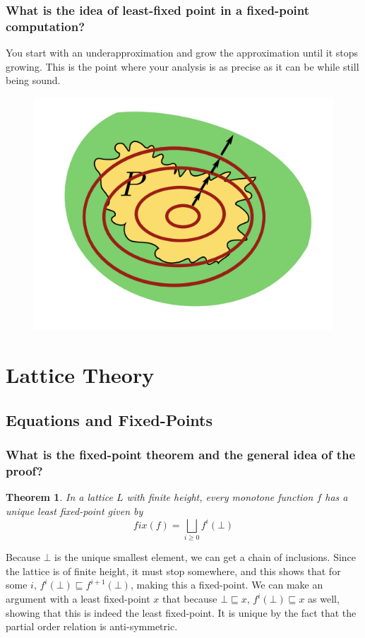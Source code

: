 \documentclass[12pt]{article}
\newenvironment{proof-idea}{\noindent{\bf Proof Idea}\hspace*{1em}}{\qed\bigskip}
\newtheorem*{theorem}{Theorem}
\theoremstyle{remark}
\theoremstyle{remark}
\begin{document}
\subsubsection{What is the idea of least-fixed point in a fixed-point computation?}
You start with an underapproximation and grow the approximation until it stops growing. This is the point where your analysis is as precise as it can be while still being sound.
\begin{figure}[h]
    \centering
    \includegraphics[scale=0.5]{least-fixed-point.png}
\end{figure}

\section{Lattice Theory}
\subsection{Equations and Fixed-Points}
\subsubsection{What is the fixed-point theorem and the general idea of the proof?}
\begin{theorem}
    In a lattice $L$ with finite height, every monotone function $f$ has a unique least fixed-point given by
    \[fix(f) = \bigsqcup_{i \geq 0} f^i (\bot)\]
\end{theorem}
\begin{proof-idea}
Because $\bot$ is the unique smallest element, we can get a chain of inclusions. Since the lattice is of finite height, it must stop somewhere, and this shows that for some $i$, $f^i(\bot) \sqsubseteq f^{i+1}(\bot)$, making this a fixed-point. We can make an argument with a least fixed-point $x$ that because $\bot \sqsubseteq x$, $f^i(\bot) \sqsubseteq x$ as well, showing that this is indeed the least fixed-point. It is unique by the fact that the partial order relation is anti-symmetric.
\end{proof-idea}

\end{document}
